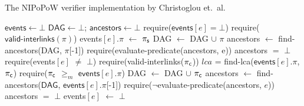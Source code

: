 \begin{algorithm}[H]

    \caption{\label{alg:initial}The \textsf{NIPoPoW} verifier implementation by
        Christoglou et.\ al.
    }
    \begin{algorithmic}[1]

    \State $\textsf{events} \gets \bot$
    \State $\textsf{DAG} \gets \bot$; $\textsf{ancestors} \gets \bot$
        \State \textsf{require}($\textsf{events$[e]$} = \bot$)
        \State \textsf{require}($\textsf{valid-interlinks}(\pi)$)
        \State \textsf{events$[e].\pi$} $\gets$ $\mathsf{\pi_{s}}$
        \State \textsf{DAG} $\gets$ \textsf{DAG} $\cup$ $\pi$
        \State \textsf{ancestors} $\gets$ \textsf{find-ancestors(DAG, $\pi$[-1])}
        \State \textsf{require}(\textsf{evaluate-predicate}(\textsf{ancestors}, e))
        \State \textsf{ancestors} $=$ $\bot$
        \EndFunction
        \State \textsf{require}(\textsf{events}$[e]$ $\ne$ $\bot$)
        \State \textsf{require}(\textsf{valid-interlinks}($\mathsf{\pi_{c}}$))
        \State $lca$ = \textsf{find-lca}($\textsf{events}[e].\pi$, $\mathsf{\pi_{c}}$)
        \State \textsf{require}($\mathsf{\pi_{c}}$ $\geq_m$ $\textsf{events}[e].\pi$)
        \State \textsf{DAG} $\gets$ \textsf{DAG} $\cup$ $\mathsf{\pi_{c}}$
        \State \textsf{ancestors} $\gets$
        \textsf{find-ancestors}($\textsf{DAG}$, $\textsf{events}[e].\pi$[-1])
        \State \textsf{require}($\neg$\textsf{evaluate-predicate}(\textsf{ancestors}, $e$))
        \State \textsf{ancestors} $=$ $\bot$
        \State \textsf{events$[e]$} $\gets$ $\bot$
    \EndFunction
    \EndContract
    \vskip8pt
    \end{algorithmic}
\end{algorithm}


